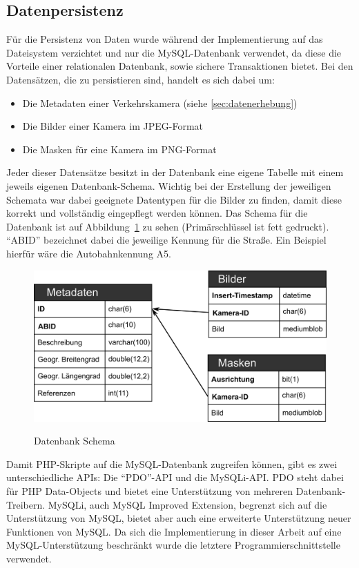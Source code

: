 \subsection{Datenpersistenz}
Für die Persistenz von Daten wurde während der Implementierung auf das Dateisystem verzichtet und nur die MySQL-Datenbank verwendet, da diese die Vorteile einer relationalen Datenbank, sowie sichere Transaktionen bietet.
Bei den Datensätzen, die zu persistieren sind, handelt es sich dabei um:
\begin{itemize}
\item{Die Metadaten einer Verkehrskamera (siehe \ref{sec:datenerhebung})}
\item{Die Bilder einer Kamera im JPEG-Format}
\item{Die Masken für eine Kamera im PNG-Format}
\end{itemize}
Jeder dieser Datensätze besitzt in der Datenbank eine eigene Tabelle mit einem jeweils eigenen Datenbank-Schema. 
Wichtig bei der Erstellung der jeweiligen Schemata war dabei geeignete Datentypen für die Bilder zu finden, damit diese korrekt und vollständig eingepflegt werden können.
Das Schema für die Datenbank ist auf Abbildung~\ref{fig:dbschema} zu sehen (Primärschlüssel ist fett gedruckt). "`ABID"' bezeichnet dabei die jeweilige Kennung für die Straße. Ein Beispiel hierfür wäre die Autobahnkennung A5.
\begin{figure}[ht]
   \centering
     \includegraphics[width=15cm]{Bilder/db-schema} \\
 \caption{Datenbank Schema}
 \label{fig:dbschema}
\end{figure}

Damit PHP-Skripte auf die MySQL-Datenbank zugreifen können, gibt es zwei unterschiedliche APIs: Die "`PDO"'-API und die MySQLi-API. 
PDO steht dabei für PHP Data-Objects und bietet eine Unterstützung von mehreren Datenbank-Treibern. 
MySQLi, auch MySQL Improved Extension, begrenzt sich auf die Unterstützung von MySQL, bietet aber auch eine erweiterte Unterstützung neuer Funktionen von MySQL.
Da sich die Implementierung in dieser Arbeit auf eine MySQL-Unterstützung beschränkt wurde die letztere Programmierschnittstelle verwendet.


